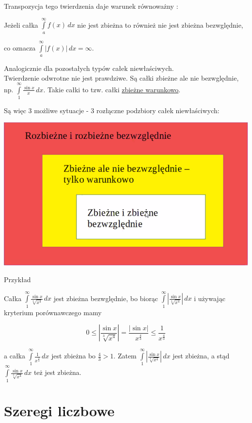 \documentclass[12pt]{article}
\begin{document}
Transpozycja tego twierdzenia daje warunek równoważny : 

Jeżeli całka $ \int\limits_{a}^{\infty} f(x) \,dx $ nie jest zbieżna to również nie jest zbieżna bezwględnie,

co oznacza $ \int\limits_{a}^{\infty} |f(x)| \,dx = \infty $.

Analogicznie dla pozostałych typów całek niewłaściwych. \\

Twierdzenie odwrotne nie jest prawdziwe. Są całki zbieżne ale nie bezwględnie, np. $ \int\limits_{1}^{\infty} \frac{\sin x}{x} \,dx $.
Takie całki to tzw. całki \underline{zbieżne warunkowo}.

Są więc 3 możliwe sytuacje - 3 rozłączne podzbiory całek niewłaściwych:

\begin{center}
\includegraphics[scale=0.6]{rozbiezneirozbiezne.png}
\end{center}

Przykład 

Całka $ \int\limits_{1}^{\infty} \frac{\sin x}{\sqrt[3]{x^4}} \,dx $ jest zbieżna bezwględnie, bo biorąc
$ \int\limits_{1}^{\infty} \left| \frac{\sin x}{\sqrt[3]{x^4}} \right| \,dx $ i używając kryterium porównawczego mamy

$$ 0 \leq \left| \frac{\sin x}{\sqrt[3]{x^4}} \right| = \frac{|\sin x|}{x^{\frac{4}{3}}} \leq \frac{1}{x^{\frac{4}{3}}} $$

a całka $ \int\limits_{1}^{\infty} \frac{1}{x^{\frac{4}{3}}} \,dx $ jest zbieżna bo $ \frac{4}{3} > 1 $.
Zatem $ \int\limits_{1}^{\infty} \left| \frac{\sin x}{\sqrt[3]{x^4}} \right| \,dx $ jest zbieżna, a stąd
$ \int\limits_{1}^{\infty} \frac{\sin x}{\sqrt[3]{x^4}} \,dx $ też jest zbieżna.


\section{Szeregi liczbowe}
\end{document}

